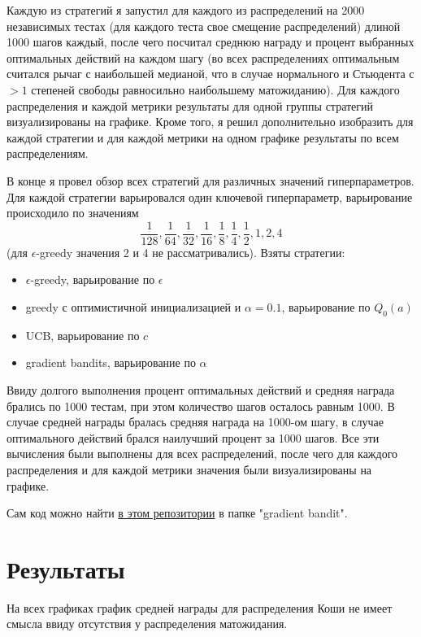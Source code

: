 \documentclass{article}
\begin{document}
Каждую из стратегий я запустил для каждого из распределений на 2000 независимых тестах (для каждого теста свое смещение распределений) длиной 1000 шагов каждый, после чего посчитал среднюю награду и процент выбранных оптимальных действий на каждом шагу (во всех распределениях оптимальным считался рычаг с наибольшей медианой, что в случае нормального и Стьюдента с 
 $> 1$ степеней свободы равносильно наибольшему матожиданию). Для каждого распределения и каждой метрики результаты для одной группы стратегий визуализированы на графике. Кроме того, я решил дополнительно изобразить для каждой стратегии и для каждой метрики на одном графике результаты по всем распределениям.

 В конце я провел обзор всех стратегий для различных значений гиперпараметров. Для каждой стратегии варьировался один ключевой гиперпараметр, варьирование происходило по значениям $$ \frac{1}{128}, \frac{1}{64}, \frac{1}{32}, \frac{1}{16}, \frac{1}{8}, \frac{1}{4}, \frac{1}{2}, 1, 2, 4$$ (для $\epsilon$-greedy значения 2 и 4 не рассматривались). Взяты стратегии:
 \begin{itemize}
     \item $\epsilon$-greedy, варьирование по $\epsilon$
     \item greedy с оптимистичной инициализацией и $\alpha = 0.1$, варьирование по $Q_0(a)$
     \item UCB, варьирование по $c$
     \item gradient bandits, варьирование по $\alpha$
 \end{itemize}
 
 Ввиду долгого выполнения процент оптимальных действий и средняя награда брались по 1000 тестам, при этом количество шагов осталось равным 1000. В случае средней награды бралась средняя награда на 1000-ом шагу, в случае оптимального действий брался наилучший процент за 1000 шагов. Все эти вычисления были выполнены для всех распределений, после чего для каждого распределения и для каждой метрики значения были визуализированы на графике.

 Сам код можно найти \href{https://github.com/davynchi/diploma/blob/main}{в этом репозитории} в папке "gradient bandit".

\section{Результаты}

На всех графиках график средней награды для распределения Коши не имеет смысла ввиду отсутствия у распределения матожидания.
\end{document}
